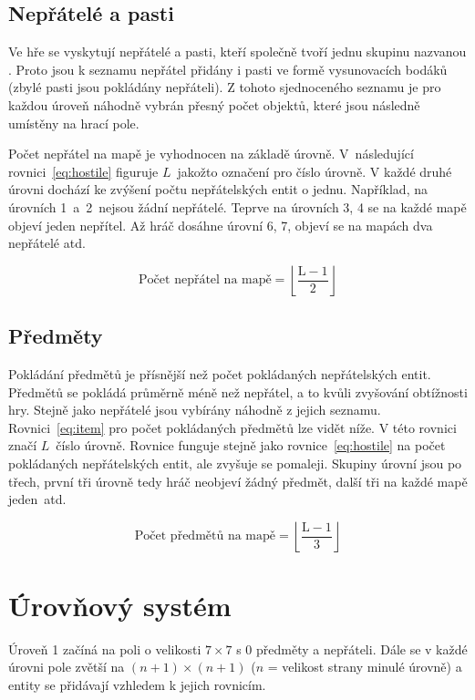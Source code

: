 \subsection*{Nepřátelé a pasti}
Ve hře se vyskytují nepřátelé a pasti, kteří společně tvoří jednu skupinu nazvanou . Proto jsou k seznamu nepřátel přidány i pasti ve formě vysunovacích bodáků (zbylé pasti jsou pokládány nepřáteli). Z tohoto sjednoceného seznamu je pro každou úroveň náhodně vybrán přesný počet objektů, které jsou následně umístěny na hrací pole.

Počet nepřátel na mapě je vyhodnocen na základě úrovně. V~následující rovnici~\ref{eq:hostile} figuruje $L$~jakožto označení pro číslo úrovně. V každé druhé úrovni dochází ke zvýšení počtu nepřátelských entit o jednu. Například, na úrovních 1~a~2~nejsou žádní nepřátelé. Teprve na úrovních 3, 4 se na každé mapě objeví jeden nepřítel. Až hráč dosáhne úrovní 6, 7, objeví se na mapách dva nepřátelé atd.

\begin{equation}
    \text{Počet nepřátel na mapě} = \left\lfloor \frac{\text{L} - 1}{2} \right\rfloor
\label{eq:hostile}
\end{equation}

\subsection*{Předměty}
Pokládání předmětů je přísnější než počet pokládaných nepřátelských entit. Předmětů se pokládá průměrně méně než nepřátel, a to kvůli zvyšování obtížnosti hry. Stejně jako nepřátelé jsou vybírány náhodně z jejich seznamu. Rovnici~\ref{eq:item} pro počet pokládaných předmětů lze vidět níže. V této rovnici značí $L$~číslo úrovně. Rovnice funguje stejně jako rovnice~\ref{eq:hostile} na počet pokládaných nepřátelských entit, ale zvyšuje se pomaleji. Skupiny úrovní jsou po třech, první tři úrovně tedy hráč neobjeví žádný předmět, další tři na každé mapě jeden~atd.

\begin{equation}
    \text{Počet předmětů na mapě} = \left\lfloor \frac{\text{L} - 1}{3} \right\rfloor
\label{eq:item}
\end{equation}

\section{Úrovňový systém}
Úroveň 1 začíná na poli o velikosti $7 \times 7$ s 0 předměty a nepřáteli. Dále se v každé úrovni pole zvětší na $(n + 1) \times (n + 1)$ ($n$ = velikost strany minulé úrovně) a entity se přidávají vzhledem k jejich rovnicím.

